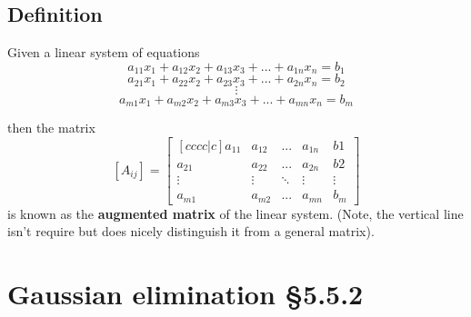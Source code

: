 \documentclass[11pt]{article}
\begin{document}
\subsection{Definition}
Given a linear system of equations
\[ a_{11}x_1 + a_{12}x_2 + a_{13}x_3 + ... + a_{1n}x_n = b_1    \]
\[ a_{21}x_1 + a_{22}x_2 + a_{23}x_3 + ... + a_{2n}x_n = b_2 \]
\[ \vdots \]
\[ a_{m1}x_1 + a_{m2}x_2 + a_{m3}x_3 + ... + a_{mn}x_n = b_m \]

then the matrix
\[
[ A_{ij}] = 
\begin{bmatrix}[cccc|c]
a_{11} & a_{12} & ... & a_{1n} & b1 \\
a_{21} & a_{22} & ... & a_{2n} & b2 \\
\vdots & \vdots & \ddots & \vdots & \vdots \\
a_{m1} & a_{m2} & ... & a_{mn} & b_m
\end{bmatrix}
\]
is known as the \textbf{augmented matrix} of the linear system. (Note, the vertical line isn't require but does nicely distinguish it from a general matrix).

\section{Gaussian elimination §5.5.2}
\end{document}
